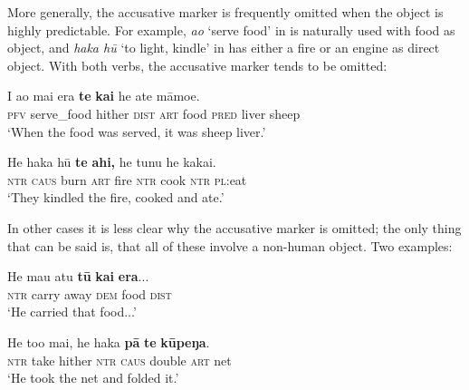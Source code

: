 More generally, the accusative marker is frequently omitted when the object is highly predictable. For example, \textit{ao} ‘serve food’ in  is naturally used with food as object, and \textit{haka hū} ‘to light, kindle’ in  has either a fire or an engine as direct object. With both verbs, the accusative marker tends to be omitted:

\ea\label{ex:8.41}
\gll I ao mai era \textbf{te} \textbf{kai} he {\ꞌ}ate māmoe.\\
\textsc{pfv} serve\_food hither \textsc{dist} \textsc{art} food \textsc{pred} liver sheep\\

\glt 
‘When the food was served, it was sheep liver.’ \textstyleExampleref{[R245.232]} 
\z

\ea\label{ex:8.42}
\gll He haka hū \textbf{te} \textbf{ahi,} he tunu he kakai.\\
\textsc{ntr} \textsc{caus} burn \textsc{art} fire \textsc{ntr} cook \textsc{ntr} \textsc{pl}:eat\\

\glt
‘They kindled the fire, cooked and ate.’ \textstyleExampleref{[R245.209]} 
\z

In other cases it is less clear why the accusative marker is omitted; the only thing that can be said is, that all of these involve a non-human object. Two examples:

\ea\label{ex:8.43}
\gll He ma{\ꞌ}u atu \textbf{tū} \textbf{kai} \textbf{era}...\\
\textsc{ntr} carry away \textsc{dem} food \textsc{dist}\\

\glt 
‘He carried that food...’ \textstyleExampleref{[R245.067]} 
\z

\ea\label{ex:8.44}
\gll He to{\ꞌ}o mai, he haka \textbf{pā} \textbf{te} \textbf{kūpeŋa}. \\
\textsc{ntr} take hither \textsc{ntr} \textsc{caus} double \textsc{art} net \\

\glt
‘He took the net and folded it.’ \textstyleExampleref{[Mtx-3-01.171]}
\z

